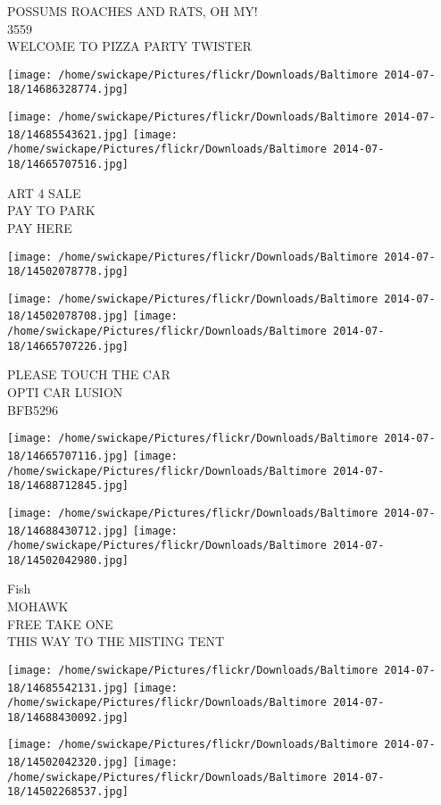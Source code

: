 \documentclass[10pt,letterpaper]{article}
\begin{document}
POSSUMS ROACHES AND RATS, OH MY!\\
3559\\
WELCOME TO PIZZA PARTY TWISTER
\pagebreak

\texttt{[image: /home/swickape/Pictures/flickr/Downloads/Baltimore 2014-07-18/14686328774.jpg]}

\vspace{0.25in}
\texttt{[image: /home/swickape/Pictures/flickr/Downloads/Baltimore 2014-07-18/14685543621.jpg]}
\texttt{[image: /home/swickape/Pictures/flickr/Downloads/Baltimore 2014-07-18/14665707516.jpg]}

ART 4 SALE\\
PAY TO PARK\\
PAY HERE
\pagebreak

\texttt{[image: /home/swickape/Pictures/flickr/Downloads/Baltimore 2014-07-18/14502078778.jpg]}

\vspace{0.25in}
\texttt{[image: /home/swickape/Pictures/flickr/Downloads/Baltimore 2014-07-18/14502078708.jpg]}
\texttt{[image: /home/swickape/Pictures/flickr/Downloads/Baltimore 2014-07-18/14665707226.jpg]}

PLEASE TOUCH THE CAR\\
OPTI CAR LUSION\\
BFB5296
\pagebreak

\texttt{[image: /home/swickape/Pictures/flickr/Downloads/Baltimore 2014-07-18/14665707116.jpg]}
\texttt{[image: /home/swickape/Pictures/flickr/Downloads/Baltimore 2014-07-18/14688712845.jpg]}

\texttt{[image: /home/swickape/Pictures/flickr/Downloads/Baltimore 2014-07-18/14688430712.jpg]}
\texttt{[image: /home/swickape/Pictures/flickr/Downloads/Baltimore 2014-07-18/14502042980.jpg]}

Fish\\
MOHAWK\\
FREE TAKE ONE\\
THIS WAY TO THE MISTING TENT
\pagebreak

\texttt{[image: /home/swickape/Pictures/flickr/Downloads/Baltimore 2014-07-18/14685542131.jpg]}
\texttt{[image: /home/swickape/Pictures/flickr/Downloads/Baltimore 2014-07-18/14688430092.jpg]}

\texttt{[image: /home/swickape/Pictures/flickr/Downloads/Baltimore 2014-07-18/14502042320.jpg]}
\texttt{[image: /home/swickape/Pictures/flickr/Downloads/Baltimore 2014-07-18/14502268537.jpg]}
\end{document}
